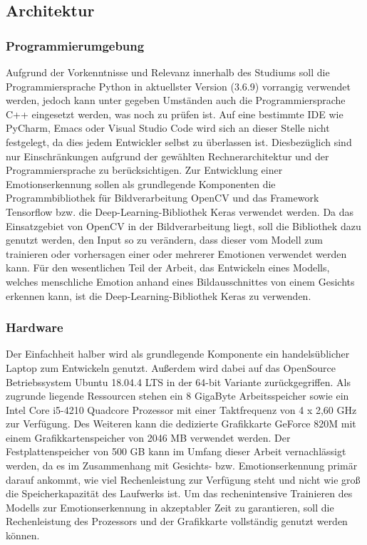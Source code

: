 \documentclass[12pt, a4paper]{report}
\begin{document}
\subsection{Architektur}

\subsubsection{Programmierumgebung}
Aufgrund der Vorkenntnisse und Relevanz innerhalb des Studiums soll die Programmiersprache Python in aktuellster Version (3.6.9) vorrangig verwendet werden, jedoch kann unter gegeben Umständen auch die Programmiersprache C++ eingesetzt werden, was noch zu prüfen ist. Auf eine bestimmte IDE wie PyCharm, Emacs oder Visual Studio Code wird sich an dieser Stelle nicht festgelegt, da dies jedem Entwickler selbst zu überlassen ist. Diesbezüglich sind nur Einschränkungen aufgrund der gewählten Rechnerarchitektur und der Programmiersprache zu berücksichtigen.\newline
Zur Entwicklung einer Emotionserkennung sollen als grundlegende Komponenten die Programmbibliothek für Bildverarbeitung OpenCV und das Framework Tensorflow bzw. die Deep-Learning-Bibliothek Keras verwendet werden. Da das Einsatzgebiet von OpenCV in der Bildverarbeitung liegt, soll die Bibliothek dazu genutzt werden, den Input so zu verändern, dass dieser vom Modell zum trainieren oder vorhersagen einer oder mehrerer Emotionen verwendet werden kann. Für den wesentlichen Teil der Arbeit, das Entwickeln eines Modells, welches menschliche Emotion anhand eines Bildausschnittes von einem Gesichts erkennen kann, ist die Deep-Learning-Bibliothek Keras zu verwenden.

\subsubsection{Hardware}
Der Einfachheit halber wird als grundlegende Komponente ein handelsüblicher Laptop zum Entwickeln genutzt.  Außerdem wird dabei auf das OpenSource Betriebssystem Ubuntu 18.04.4 LTS in der 64-bit Variante zurückgegriffen. Als zugrunde liegende Ressourcen stehen ein 8 GigaByte Arbeitsspeicher sowie ein Intel Core i5-4210 Quadcore Prozessor mit einer Taktfrequenz von 4 x 2,60 GHz zur Verfügung. Des Weiteren kann die dedizierte Grafikkarte GeForce 820M mit einem Grafikkartenspeicher von 2046 MB verwendet werden. Der Festplattenspeicher von 500 GB kann im Umfang dieser Arbeit vernachlässigt werden, da es im Zusammenhang mit Gesichts- bzw. Emotionserkennung primär darauf ankommt, wie viel Rechenleistung zur Verfügung steht und nicht wie groß die Speicherkapazität des Laufwerks ist. Um das rechenintensive Trainieren des Modells zur Emotionserkennung in akzeptabler Zeit zu garantieren, soll die Rechenleistung des Prozessors und der Grafikkarte vollständig genutzt werden können.
\end{document}
